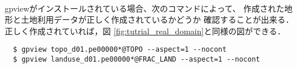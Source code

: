 \vspace{1cm}
 \hrulefill \\
gpviewがインストールされている場合、次のコマンドによって、
作成された地形と土地利用データが正しく作成されているかどうか
確認することが出来る．正しく作成されていれば，図 \ref{fig:tutrial_real_domain}と同様の図ができる．
\begin{verbatim}
  $ gpview topo_d01.pe00000*@TOPO --aspect=1 --nocont
  $ gpview landuse_d01.pe00000*@FRAC_LAND --aspect=1 --nocont
\end{verbatim}

